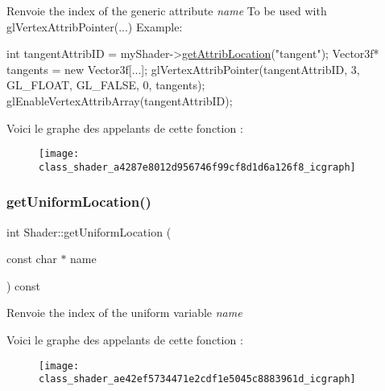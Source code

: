 \begin{DoxyReturn}{Renvoie}
the index of the generic attribute {\itshape name} To be used with gl\+Vertex\+Attrib\+Pointer(...) Example\+: 
\begin{DoxyCode}
\textcolor{keywordtype}{int} tangentAttribID = myShader->\hyperlink{class_shader_a4287e8012d956746f99cf8d1d6a126f8}{getAttribLocation}(\textcolor{stringliteral}{"tangent"});
Vector3f* tangents = \textcolor{keyword}{new} Vector3f[...];
glVertexAttribPointer(tangentAttribID, 3, GL\_FLOAT, GL\_FALSE, 0, tangents);
glEnableVertexAttribArray(tangentAttribID);
\end{DoxyCode}
 
\end{DoxyReturn}
Voici le graphe des appelants de cette fonction \+:\nopagebreak
\begin{figure}[H]
\begin{center}
\leavevmode
\texttt{[image: class\_shader\_a4287e8012d956746f99cf8d1d6a126f8\_icgraph]}
\end{center}
\end{figure}
\mbox{\label{class_shader_ae42ef5734471e2cdf1e5045c8883961d}} 
\subsubsection{\texorpdfstring{get\+Uniform\+Location()}{getUniformLocation()}}
{\footnotesize\ttfamily int Shader\+::get\+Uniform\+Location (\begin{DoxyParamCaption}\item[{const char $\ast$}]{name }\end{DoxyParamCaption}) const}

\begin{DoxyReturn}{Renvoie}
the index of the uniform variable {\itshape name} 
\end{DoxyReturn}
Voici le graphe des appelants de cette fonction \+:\nopagebreak
\begin{figure}[H]
\begin{center}
\leavevmode
\texttt{[image: class\_shader\_ae42ef5734471e2cdf1e5045c8883961d\_icgraph]}
\end{center}
\end{figure}
\mbox{\label{class_shader_ac6f8837bdac2997de1a79c9a518c664c}} 
